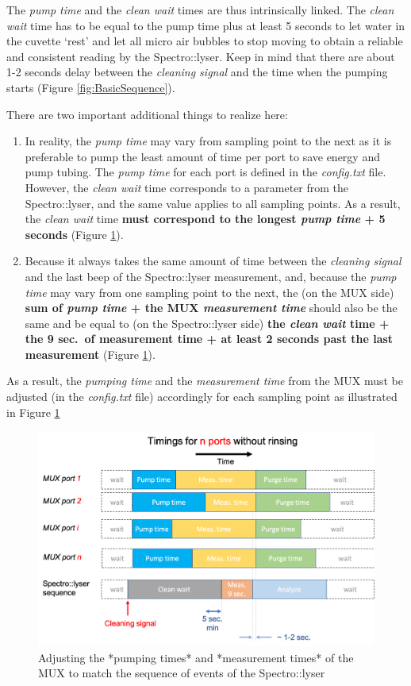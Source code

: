 \documentclass[]{book}
\begin{document}
The \emph{pump time} and the \emph{clean wait} times are thus intrinsically linked. The \emph{clean wait} time has to be equal to the pump time plus at least 5 seconds to let water in the cuvette `rest' and let all micro air bubbles to stop moving to obtain a reliable and consistent reading by the Spectro::lyser. Keep in mind that there are about 1-2 seconds delay between the \emph{cleaning signal} and the time when the pumping starts (Figure \ref{fig:BasicSequence}).

There are two important additional things to realize here:

\begin{enumerate}
\def\labelenumi{\arabic{enumi}.}
\item
  In reality, the \emph{pump time} may vary from sampling point to the next as it is preferable to pump the least amount of time per port to save energy and pump tubing. The \emph{pump time} for each port is defined in the \emph{config.txt} file. However, the \emph{clean wait} time corresponds to a parameter from the Spectro::lyser, and the same value applies to all sampling points. As a result, the \emph{clean wait} time \textbf{must correspond to the longest \emph{pump time} + 5 seconds} (Figure \ref{fig:TimingsSeveralPorts}).
\item
  Because it always takes the same amount of time between the \emph{cleaning signal} and the last beep of the Spectro::lyser measurement, and, because the \emph{pump time} may vary from one sampling point to the next, the (on the MUX side) \textbf{sum of \emph{pump time} + the MUX \emph{measurement time}} should also be the same and be equal to (on the Spectro::lyser side) \textbf{the \emph{clean wait} time + the 9 sec.~of measurement time + at least 2 seconds past the last measurement} (Figure \ref{fig:TimingsSeveralPorts}).
\end{enumerate}

As a result, the \emph{pumping time} and the \emph{measurement time} from the MUX must be adjusted (in the \emph{config.txt} file) accordingly for each sampling point as illustrated in Figure \ref{fig:TimingsSeveralPorts}

\begin{figure}

{\centering \includegraphics[width=0.8\linewidth]{pictures/TimingsSeveralPorts} 

}

\caption{Adjusting the *pumping times* and *measurement times* of the MUX to match the sequence of events of the Spectro::lyser}\label{fig:TimingsSeveralPorts}
\end{figure}
\end{document}

